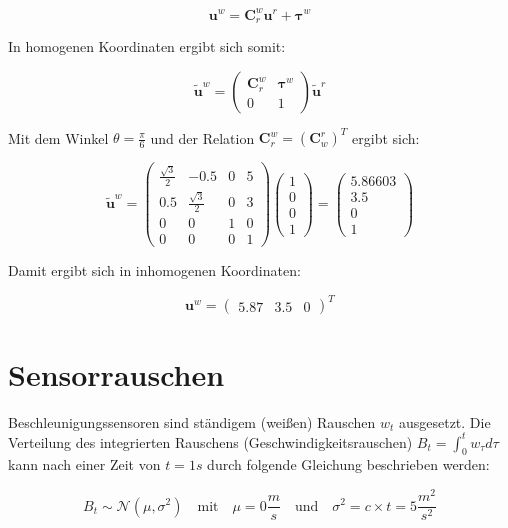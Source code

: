 \documentclass[12pt,a4paper]{report}
\begin{document}
\[
    \mathbf{u}^w = \mathbf{C}^w_r\mathbf{u}^r + \boldsymbol{\tau}^w
\]

In homogenen Koordinaten ergibt sich somit:

\[
    \tilde{\mathbf{u}}^w =
    \begin{pmatrix}
        \mathbf{C}^w_r & \boldsymbol{\tau}^w \\
        0              & 1
    \end{pmatrix}
    \tilde{\mathbf{u}}^r
\]

Mit dem Winkel \(\theta = \frac{\pi}{6}\) und der Relation \(\mathbf{C}^w_r = (\mathbf{C}^r_w)^T\) ergibt sich:

\[
    \tilde{\mathbf{u}}^w = \begin{pmatrix}
        \frac{\sqrt{3}}{2} & -0.5               & 0 & 5 \\
        0.5                & \frac{\sqrt{3}}{2} & 0 & 3 \\
        0                  & 0                  & 1 & 0 \\
        0                  & 0                  & 0 & 1
    \end{pmatrix}
    \begin{pmatrix}
        1 \\ 0 \\ 0 \\ 1
    \end{pmatrix}
    =
    \begin{pmatrix}
        5.86603 \\ 3.5 \\ 0 \\ 1
    \end{pmatrix}
\]

Damit ergibt sich in inhomogenen Koordinaten:

\[\mathbf{u}^w = \begin{pmatrix} 5.87 & 3.5 & 0 \end{pmatrix}^{T}\]

\chapter{Sensorrauschen}

Beschleunigungssensoren sind ständigem (weißen) Rauschen \(w_t\) ausgesetzt. Die Verteilung des integrierten Rauschens (Geschwindigkeitsrauschen) \(B_t = \int_0^t w_\tau d\tau\) kann nach einer Zeit von \(t = 1s\) durch folgende Gleichung beschrieben werden:

\[
    B_t \sim \mathcal{N}(\mu, \sigma^2) \quad \text{mit} \quad \mu = 0 \frac{m}{s} \quad \text{und} \quad \sigma^2 = c \times t = 5 \frac{m^2}{s^2}
\]
\end{document}
